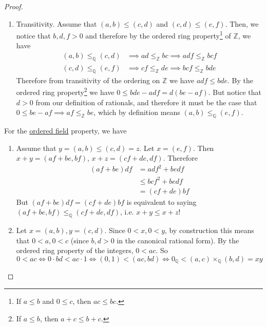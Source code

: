\begin{proof}
\begin{enumerate}
      \item Transitivity. Assume that $(a, b) \leq (c, d)$ and $(c, d) \leq (e, f)$. Then, we notice that $b, d, f > 0$ and therefore by the ordered ring property\footnote{If $a \leq b$ and $0 \leq c$, then $ac \leq bc$.} of $\mathbb{Z}$, we have 
      \begin{align}
        (a, b) \leq_{\mathbb{Q}} (c, d) & \implies ad \leq_{\mathbb{Z}} bc \implies adf \leq_{\mathbb{Z}} bcf \\ 
        (c, d) \leq_{\mathbb{Q}} (e, f) & \implies cf \leq_{\mathbb{Z}} de \implies bcf \leq_{\mathbb{Z}} bde
      \end{align}
      Therefore from transitivity of the ordering on $\mathbb{Z}$ we have $adf \leq bde$. By the ordered ring property\footnote{If $a \leq b$, then $a + c \leq b + c$.}  we have $0 \leq bde - adf = d(be - af)$. But notice that $d > 0$ from our definition of rationals, and therefore it must be the case that $0 \leq be - af \implies af \leq_{\mathbb{Z}} be$, which by definition means $(a, b) \leq_{\mathbb{Q}} (e, f)$. 
    \end{enumerate}
    For the \hyperref[def:ordered-field]{ordered field} property, we have 
    \begin{enumerate}
      \item Assume that $y = (a, b) \leq (c, d) = z$. Let $x = (e, f)$. Then $x + y = (af + be, bf)$, $x + z = (cf + de, df)$. Therefore 
      \begin{align}
        (af + be) df & = adf^2 + bedf \\ 
                     & \leq bcf^2 + bedf \\
                     & = (cf + de) bf
      \end{align} 
      But $(af + be) df = (cf + de) bf$ is equivalent to saying $(af + be, bf) \leq_{\mathbb{Q}} (cf + de, df)$, i.e. $x + y \leq x + z$!  

      \item Let $x = (a, b), y = (c, d)$. Since $0 < x, 0 < y$, by construction this means that $0 < a, 0 < c$ (since $b, d > 0$ in the canonical rational form). By the ordered ring property of the integers, $0 < ac$. So 
      \begin{equation}
        0 < ac \iff 0 \cdot bd < ac \cdot 1 \iff (0, 1) < (ac, bd)  \iff 0_{\mathbb{Q}} < (a, c) \times_{\mathbb{Q}} (b, d) = x y
      \end{equation}
    \end{enumerate}
  \end{proof} 

